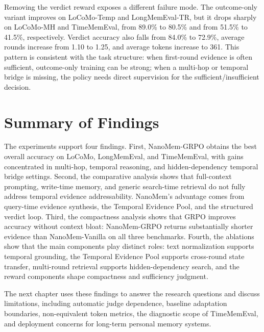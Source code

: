 Removing the verdict reward exposes a different failure mode. The outcome-only
variant improves on LoCoMo-Temp and LongMemEval-TR, but it drops sharply on
LoCoMo-MH and TimeMemEval, from 89.0\% to 80.5\% and from 51.5\% to 41.5\%,
respectively. Verdict accuracy also falls from 84.0\% to 72.9\%, average rounds
increase from 1.10 to 1.25, and average tokens increase to 361. This pattern is
consistent with the task structure: when first-round evidence is often
sufficient, outcome-only training can be strong; when a multi-hop or temporal
bridge is missing, the policy needs direct supervision for the
sufficient/insufficient decision.

\section{Summary of Findings}
\label{sec:experiment-summary}

The experiments support four findings. First, NanoMem-GRPO obtains the best
overall accuracy on LoCoMo, LongMemEval, and TimeMemEval, with gains
concentrated in multi-hop, temporal reasoning, and hidden-dependency temporal
bridge settings. Second, the comparative analysis shows that full-context
prompting, write-time memory, and generic search-time retrieval do not fully
address temporal evidence addressability. NanoMem's advantage comes from
query-time evidence synthesis, the Temporal Evidence Pool, and the structured
verdict loop. Third, the compactness analysis shows that GRPO improves accuracy
without context bloat: NanoMem-GRPO returns substantially shorter evidence than
NanoMem-Vanilla on all three benchmarks. Fourth, the ablations show that the
main components play distinct roles: text normalization supports temporal
grounding, the Temporal Evidence Pool supports cross-round state transfer,
multi-round retrieval supports hidden-dependency search, and the reward
components shape compactness and sufficiency judgment.

The next chapter uses these findings to answer the research questions and
discuss limitations, including automatic judge dependence, baseline adaptation
boundaries, non-equivalent token metrics, the diagnostic scope of TimeMemEval,
and deployment concerns for long-term personal memory systems.
